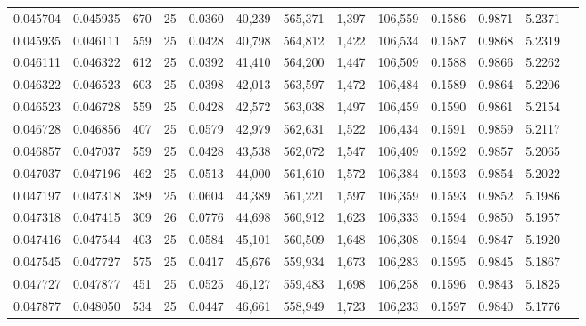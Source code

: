 \begin{tabular}{rrrrrrrrrrrrr}
0.045704 & 0.045935 &   670 &  25 &                                     0.0360 &  40,239 & 565,371 &   1,397 & 106,559 & 0.1586 & 0.9871 & 5.2371 \\
0.045935 & 0.046111 &   559 &  25 &                                     0.0428 &  40,798 & 564,812 &   1,422 & 106,534 & 0.1587 & 0.9868 & 5.2319 \\
0.046111 & 0.046322 &   612 &  25 &                                     0.0392 &  41,410 & 564,200 &   1,447 & 106,509 & 0.1588 & 0.9866 & 5.2262 \\
0.046322 & 0.046523 &   603 &  25 &                                     0.0398 &  42,013 & 563,597 &   1,472 & 106,484 & 0.1589 & 0.9864 & 5.2206 \\
0.046523 & 0.046728 &   559 &  25 &                                     0.0428 &  42,572 & 563,038 &   1,497 & 106,459 & 0.1590 & 0.9861 & 5.2154 \\
0.046728 & 0.046856 &   407 &  25 &                                     0.0579 &  42,979 & 562,631 &   1,522 & 106,434 & 0.1591 & 0.9859 & 5.2117 \\
0.046857 & 0.047037 &   559 &  25 &                                     0.0428 &  43,538 & 562,072 &   1,547 & 106,409 & 0.1592 & 0.9857 & 5.2065 \\
0.047037 & 0.047196 &   462 &  25 &                                     0.0513 &  44,000 & 561,610 &   1,572 & 106,384 & 0.1593 & 0.9854 & 5.2022 \\
0.047197 & 0.047318 &   389 &  25 &                                     0.0604 &  44,389 & 561,221 &   1,597 & 106,359 & 0.1593 & 0.9852 & 5.1986 \\
0.047318 & 0.047415 &   309 &  26 &                                     0.0776 &  44,698 & 560,912 &   1,623 & 106,333 & 0.1594 & 0.9850 & 5.1957 \\
0.047416 & 0.047544 &   403 &  25 &                                     0.0584 &  45,101 & 560,509 &   1,648 & 106,308 & 0.1594 & 0.9847 & 5.1920 \\
0.047545 & 0.047727 &   575 &  25 &                                     0.0417 &  45,676 & 559,934 &   1,673 & 106,283 & 0.1595 & 0.9845 & 5.1867 \\
0.047727 & 0.047877 &   451 &  25 &                                     0.0525 &  46,127 & 559,483 &   1,698 & 106,258 & 0.1596 & 0.9843 & 5.1825 \\
0.047877 & 0.048050 &   534 &  25 &                                     0.0447 &  46,661 & 558,949 &   1,723 & 106,233 & 0.1597 & 0.9840 & 5.1776 \\

\end{tabular}
